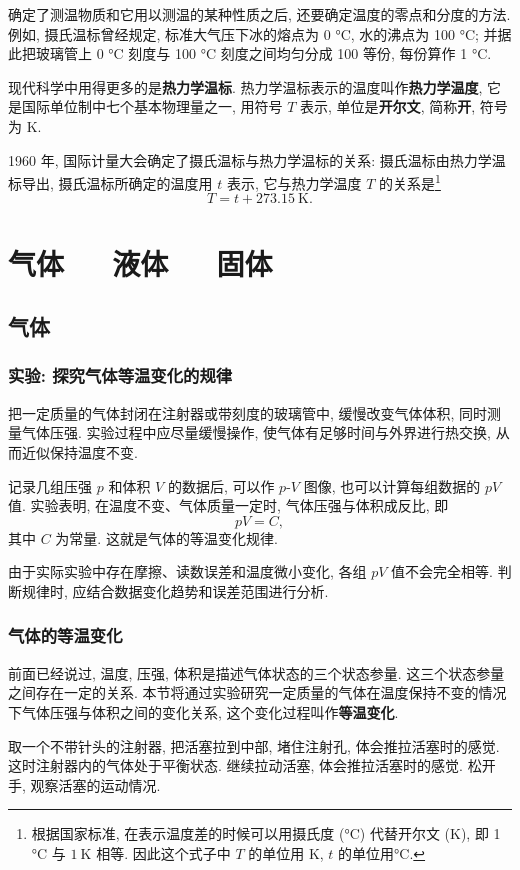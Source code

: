 \documentclass[UTF8,openany,fontset=fandol]{ctexbook}
\theoremstyle{chinesetextbook}
\newcommand{\bre}{\ \ \ }
\newcommand{\unit}[1]{\ \mathrm{#1}}
\begin{document}
确定了测温物质和它用以测温的某种性质之后, 还要确定温度的零点和分度的方法. 例如, 摄氏温标曾经规定, 标准大气压下冰的熔点为 0 °C, 水的沸点为 100 °C; 并据此把玻璃管上 0 °C 刻度与 100 °C 刻度之间均匀分成 100 等份, 每份算作 1 °C.

现代科学中用得更多的是\textbf{热力学温标}. 热力学温标表示的温度叫作\textbf{热力学温度}, 它是国际单位制中七个基本物理量之一, 用符号 $T$ 表示, 单位是\textbf{开尔文}, 简称\textbf{开}, 符号为 K.

1960 年, 国际计量大会确定了摄氏温标与热力学温标的关系: 摄氏温标由热力学温标导出, 摄氏温标所确定的温度用 $t$ 表示, 它与热力学温度 $T$ 的关系是\footnote{根据国家标准, 在表示温度差的时候可以用摄氏度 (°C) 代替开尔文 (K), 即 1 °C 与 $1\unit{K}$ 相等. 因此这个式子中 $T$ 的单位用 K, $t$ 的单位用°C.}
\[
T=t+273.15\unit{K}.
\]
\chapter{气体\bre 液体\bre 固体}
\section{气体}
\subsection{实验: 探究气体等温变化的规律}
把一定质量的气体封闭在注射器或带刻度的玻璃管中, 缓慢改变气体体积, 同时测量气体压强. 实验过程中应尽量缓慢操作, 使气体有足够时间与外界进行热交换, 从而近似保持温度不变.

记录几组压强 $p$ 和体积 $V$ 的数据后, 可以作 $p$-$V$ 图像, 也可以计算每组数据的 $pV$ 值. 实验表明, 在温度不变、气体质量一定时, 气体压强与体积成反比, 即
\[
pV=C,
\]
其中 $C$ 为常量. 这就是气体的等温变化规律.

由于实际实验中存在摩擦、读数误差和温度微小变化, 各组 $pV$ 值不会完全相等. 判断规律时, 应结合数据变化趋势和误差范围进行分析.
\subsection{气体的等温变化}
前面已经说过, 温度, 压强, 体积是描述气体状态的三个状态参量. 这三个状态参量之间存在一定的关系. 本节将通过实验研究一定质量的气体在温度保持不变的情况下气体压强与体积之间的变化关系, 这个变化过程叫作\textbf{等温变化}.

{\kaishu 取一个不带针头的注射器, 把活塞拉到中部, 堵住注射孔, 体会推拉活塞时的感觉. 这时注射器内的气体处于平衡状态. 继续拉动活塞, 体会推拉活塞时的感觉. 松开手, 观察活塞的运动情况.}
\end{document}
